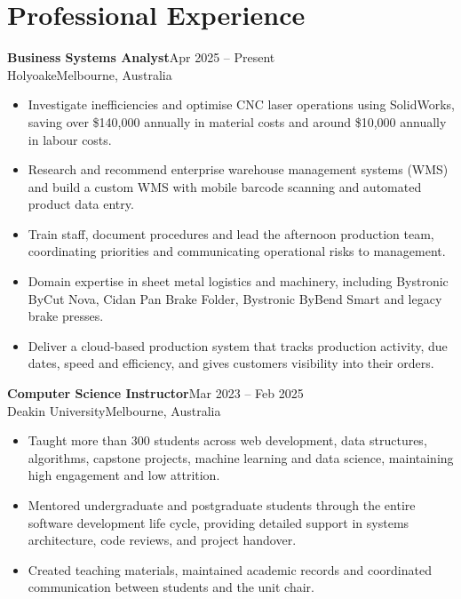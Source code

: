 \documentclass[11pt,a4paper]{article}
\newcommand{\role}[4]{\Needspace{6\baselineskip}\textbf{#1}\hfill{\small #2}\\{\color{muted}#3\hfill #4}\par}
\begin{document}
\section{Professional Experience}
\role{Business Systems Analyst}{Apr 2025 -- Present}{Holyoake}{Melbourne, Australia}
\begin{itemize}
\item Investigate inefficiencies and optimise CNC laser operations using SolidWorks, saving over \$140,000 annually in material costs and around \$10,000 annually in labour costs.
\item Research and recommend enterprise warehouse management systems (WMS) and build a custom WMS with mobile barcode scanning and automated product data entry.
\item Train staff, document procedures and lead the afternoon production team, coordinating priorities and communicating operational risks to management.
\item Domain expertise in sheet metal logistics and machinery, including Bystronic ByCut Nova, Cidan Pan Brake Folder, Bystronic ByBend Smart and legacy brake presses.
\item Deliver a cloud-based production system that tracks production activity, due dates, speed and efficiency, and gives customers visibility into their orders.

\end{itemize}

\role{Computer Science Instructor}{Mar 2023 -- Feb 2025}{Deakin University}{Melbourne, Australia}
\begin{itemize}
\item Taught more than 300 students across web development, data structures, algorithms, capstone projects, machine learning and data science, maintaining high engagement and low attrition.
\item Mentored undergraduate and postgraduate students through the entire software development life cycle, providing detailed support in systems architecture, code reviews, and project handover.
\item Created teaching materials, maintained academic records and coordinated communication between students and the unit chair.
\end{itemize}
\end{document}
